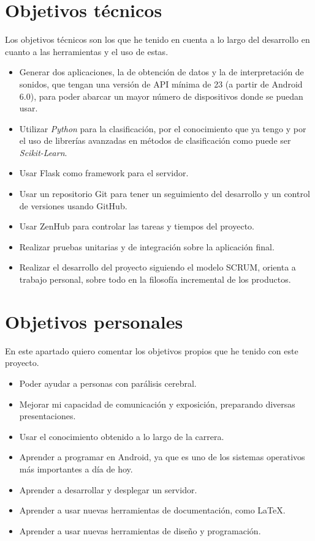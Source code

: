 \section{Objetivos técnicos}
Los objetivos técnicos son los que he tenido en cuenta a lo largo del desarrollo en cuanto a las herramientas y el uso de estas.
\begin{itemize}
	\item
	Generar dos aplicaciones, la de obtención de datos y la de interpretación de sonidos, que tengan una versión de API mínima de 23 (a partir de Android 6.0), para poder abarcar un mayor número de dispositivos donde se puedan usar.
	\item 
	Utilizar \textit{Python} para la clasificación, por el conocimiento que ya tengo y por el uso de librerías avanzadas en métodos de clasificación como puede ser \textit{Scikit-Learn}.
	\item
	Usar Flask como framework para el servidor.
	\item 
	Usar un repositorio Git para tener un seguimiento del desarrollo y un control de versiones usando GitHub.
	\item 
	Usar ZenHub para controlar las tareas y tiempos del proyecto.
	\item
	Realizar pruebas unitarias y de integración sobre la aplicación final.
	\item
	Realizar el desarrollo del proyecto siguiendo el modelo SCRUM, orienta a trabajo personal, sobre todo en la filosofía incremental de los productos.
\end{itemize}

\section{Objetivos personales}\label{objpers}
En este apartado quiero comentar los objetivos propios que he tenido con este proyecto.
\begin{itemize}
	\item
	Poder ayudar a personas con parálisis cerebral.
	\item 
	Mejorar mi capacidad de comunicación y exposición, preparando diversas presentaciones.
	\item
	Usar el conocimiento obtenido a lo largo de la carrera.
	\item 
	Aprender a programar en Android, ya que es uno de los sistemas operativos más importantes a día de hoy.
	\item 
	Aprender a desarrollar y desplegar un servidor.
	\item 
	Aprender a usar nuevas herramientas de documentación, como \LaTeX.
	\item 
	Aprender a usar nuevas herramientas de diseño y programación.
\end{itemize}